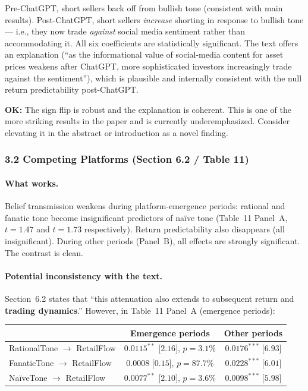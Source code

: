 \documentclass[11pt]{article}
\newcommand{\ok}[1]{\textcolor{ok}{\textbf{OK:} #1}}
\begin{document}
Pre-ChatGPT, short sellers back off from bullish tone (consistent with
main results). Post-ChatGPT, short sellers \textit{increase} shorting in
response to bullish tone --- i.e., they now trade \textit{against} social
media sentiment rather than accommodating it. All six coefficients are
statistically significant. The text offers an explanation (``as the
informational value of social-media content for asset prices weakens
after ChatGPT, more sophisticated investors increasingly trade against
the sentiment''), which is plausible and internally consistent with the
null return predictability post-ChatGPT.

\ok{The sign flip is robust and the explanation is coherent. This is one
of the more striking results in the paper and is currently underemphasized.
Consider elevating it in the abstract or introduction as a novel finding.}

\subsubsection*{3.2 Competing Platforms (Section 6.2 / Table 11)}

\paragraph{What works.}
Belief transmission weakens during platform-emergence periods: rational
and fanatic tone become insignificant predictors of na\"{i}ve tone
(Table~11 Panel~A, $t=1.47$ and $t=1.73$ respectively). Return
predictability also disappears (all insignificant). During other periods
(Panel~B), all effects are strongly significant. The contrast is clean.

\paragraph{Potential inconsistency with the text.}
Section~6.2 states that ``this attenuation also extends to subsequent
return and \textbf{trading dynamics}.'' However, in Table~11 Panel~A
(emergence periods):

\begin{center}
\begin{tabular}{lcc}
\toprule
 & Emergence periods & Other periods \\
\midrule
RationalTone $\to$ RetailFlow & $0.0115^{**}$ [$2.16$], $p=3.1\%$ & $0.0176^{***}$ [$6.93$] \\
FanaticTone $\to$ RetailFlow  & $0.0008$ [$0.15$], $p=87.7\%$ & $0.0228^{***}$ [$6.01$] \\
Na\"{i}veTone $\to$ RetailFlow & $0.0077^{**}$ [$2.10$], $p=3.6\%$ & $0.0098^{***}$ [$5.98$] \\
\bottomrule
\end{tabular}
\end{center}
\end{document}
